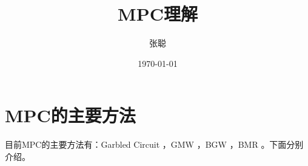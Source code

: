 \documentclass[UTF8]{ctexart}
\title{\heiti MPC理解}
\author{\kaishu 张聪 }
\date{\today}
\theoremstyle{nonumberplain}
\theoremstyle{plain}
\begin{document}
	
	\maketitle
	

	

\section{MPC的主要方法}

目前MPC的主要方法有：Garbled Circuit \cite{DBLP:conf/focs/Yao86}，GMW \cite{DBLP:conf/stoc/GoldreichMW87}，BGW \cite{DBLP:conf/stoc/Ben-OrGW88}，BMR \cite{DBLP:conf/stoc/BeaverMR90}。下面分别介绍。
\end{document}
